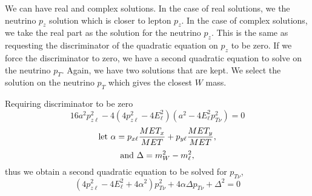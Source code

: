 We can have real and complex solutions. In the case of real solutions, we the neutrino $p_{z}$ solution which is closer to lepton $p_{z}$. In the case of complex solutions, we take
the real part as the solution for the neutrino $p_z$. This is the same
as requesting the discriminator of the quadratic equation on $p_z$ to be zero.
If we force the discriminator to zero, we have a second quadratic equation
to solve on the neutrino $p_T$. Again, we have two solutions that are kept.
We select the solution on the neutrino $p_T$ which gives the closest $W$ mass.

Requiring discriminator to be zero
$$ 16a^2{p}_{z\ell}^2 - 4(4{p}_{z\ell}^2 -4{E}_{\ell}^2)(a^2 - 4{E}_{\ell}^2{p}_{T\nu}^2) = 0 $$
$$ {\rm let}~ \alpha = p_{x\ell}\frac{MET_x}{MET} + p_{y\ell}\frac{MET_y}{MET},$$
$$ {\rm and}~ \Delta = m_W^2 - m_{\ell}^2,$$
thus we obtain a second quadratic equation to be solved for $p_{T\nu}$,
$$ (4{p}_{z\ell}^2 -4E_{\ell}^2+4\alpha^2){p}_{T\nu}^2 + 4\alpha \Delta {p}_{T\nu} +\Delta^2 = 0 $$

  
\newpage
